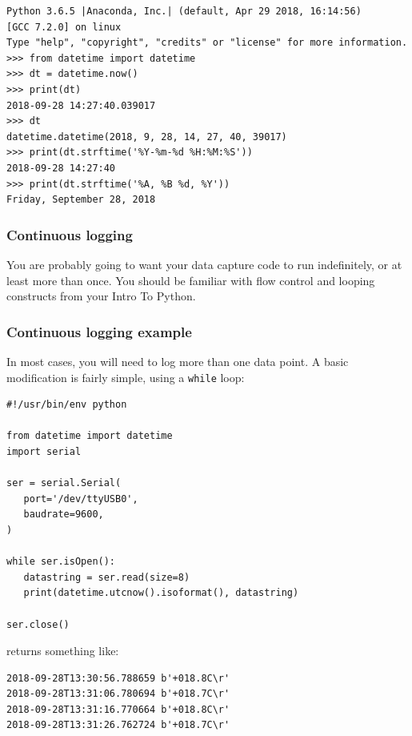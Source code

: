 \documentclass[aspectratio=1610,9pt]{beamer} %
\begin{document}
\begin{frame}[fragile]
\begin{verbatim}
Python 3.6.5 |Anaconda, Inc.| (default, Apr 29 2018, 16:14:56)
[GCC 7.2.0] on linux
Type "help", "copyright", "credits" or "license" for more information.
>>> from datetime import datetime
>>> dt = datetime.now()
>>> print(dt)
2018-09-28 14:27:40.039017
>>> dt
datetime.datetime(2018, 9, 28, 14, 27, 40, 39017)
>>> print(dt.strftime('%Y-%m-%d %H:%M:%S'))
2018-09-28 14:27:40
>>> print(dt.strftime('%A, %B %d, %Y'))
Friday, September 28, 2018
\end{verbatim}

\end{frame}
\begin{frame}
\frametitle{Continuous logging}

You are probably going to want your data capture code to run
indefinitely, or at least more than once. You should be familiar with
flow control and looping constructs from your Intro To Python.

\end{frame}
\begin{frame}[fragile]
\frametitle{Continuous logging example}

In most cases, you will need to log more than one data point. A basic
modification is fairly simple, using a \texttt{while} loop:

\begin{verbatim}
#!/usr/bin/env python

from datetime import datetime
import serial

ser = serial.Serial(
   port='/dev/ttyUSB0',
   baudrate=9600,
)

while ser.isOpen():
   datastring = ser.read(size=8)
   print(datetime.utcnow().isoformat(), datastring)

ser.close()
\end{verbatim}

returns something like:

\begin{verbatim}
2018-09-28T13:30:56.788659 b'+018.8C\r'
2018-09-28T13:31:06.780694 b'+018.7C\r'
2018-09-28T13:31:16.770664 b'+018.8C\r'
2018-09-28T13:31:26.762724 b'+018.7C\r'
\end{verbatim}

\end{frame}
\end{document}
